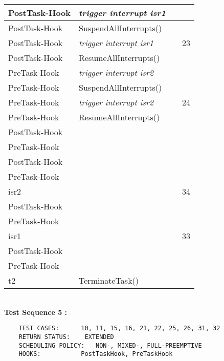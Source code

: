 \documentclass[10pt]{article}
\newlength{\Li}\settowidth{\Li}{Running}
\newlength{\Lii}\setlength{\Lii}{7cm}
\newlength{\Liiii}\setlength{\Liiii}{0.9cm}
\newlength{\Liii}\setlength{\Liii}{\textwidth} \addtolength{\Liii}{-\Li} \addtolength{\Liii}{-\Lii} \addtolength{\Liii}{-\Liiii}
\begin{document}
\begin{supertabular}{|p{\Li}|p{\Lii}|p{\Liii}|p{\Liiii}|}
	PostTask-Hook	& \textit{trigger interrupt isr1}					&				& \\ \hline
	PostTask-Hook	& SuspendAllInterrupts()						&				& \\ \hline
	PostTask-Hook	& \textit{trigger interrupt isr1}					&				& 23\\ \hline
	PostTask-Hook	& ResumeAllInterrupts()						&				& \\ \hline
	PreTask-Hook	& \textit{trigger interrupt isr2}					&				& \\ \hline
	PreTask-Hook	& SuspendAllInterrupts()						&				& \\ \hline
	PreTask-Hook	& \textit{trigger interrupt isr2}					&				& 24\\ \hline
	PreTask-Hook	& ResumeAllInterrupts()						&				& \\ \hline
	
	PostTask-Hook	&										&				& \\ \hline
	PreTask-Hook	&										&				& \\ \hline
	
	PostTask-Hook	&										&				& \\ \hline
	PreTask-Hook	&										&				& \\ \hline
		
	isr2			& 										& 				& 34\\ \hline
	
	PostTask-Hook	&										&				& \\ \hline
	PreTask-Hook	&										&				& \\ \hline
		
	isr1			& 										& 				& 33\\ \hline
	
	PostTask-Hook	&										&				& \\ \hline
	PreTask-Hook	&										&				& \\ \hline
	
	t2			& TerminateTask()							& 				& \\ \hline
	
	\end{supertabular}\\
	
	\textbf{Test Sequence 5 :}
	\begin{lstlisting}
	TEST CASES:		 10, 11, 15, 16, 21, 22, 25, 26, 31, 32
	RETURN STATUS:	  EXTENDED
	SCHEDULING POLICY:   NON-, MIXED-, FULL-PREEMPTIVE
	HOOKS:			 PostTaskHook, PreTaskHook
	\end{lstlisting}
	
	
\end{document}
